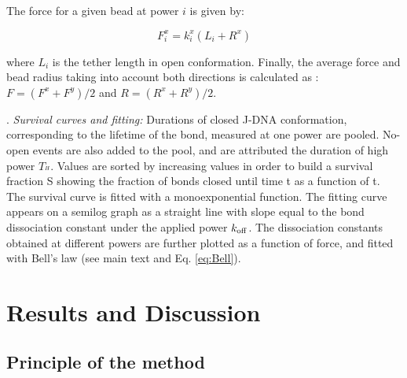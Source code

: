 \documentclass{biophys-new}
\begin{document}
The force for a given bead at power $i$ is given by:

\begin{equation}
\label{eq:Force}
F^x_i = k^x_i(L_i + R^x)
\end{equation}

\noindent where $L_i$ is the tether length in open conformation. Finally, the average force and bead radius taking into account both directions is calculated as : $F = (F^x + F^y)/2$ and $R = (R^x + R^y)/2$.


. \textit{Survival curves and fitting:}
Durations of closed J-DNA conformation, corresponding to the lifetime of the bond, measured at one power are pooled. No-open events are also added to the pool, and are attributed the duration of high power $T_{^H}$. Values are sorted by increasing values in order to build a survival fraction S showing the fraction of bonds closed until time t as a function of t. The survival curve is fitted with a monoexponential function. The fitting curve appears on a semilog graph as a straight line with slope equal to the bond dissociation constant under the applied power $k_{\rm off}$. The dissociation constants obtained at different powers are further plotted as a function of force, and fitted with Bell's law (see main text and Eq. \ref{eq:Bell}).


\section*{Results and Discussion}


\subsection*{Principle of the method}
\end{document}
